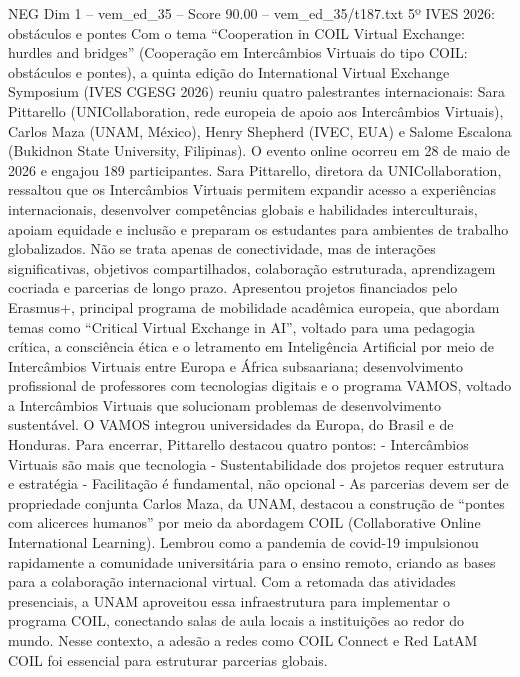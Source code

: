 \begin{textsample}{NEG Dim 1 – vem\_ed\_35 – Score 90.00 – vem\_ed\_35/t187.txt}  \label{ex:f1_neg_179}
5º IVES 2026: obstáculos e pontes Com o tema “Cooperation in COIL Virtual Exchange: hurdles and bridges” (Cooperação em Intercâmbios Virtuais do tipo COIL: obstáculos e pontes), a quinta edição do International Virtual Exchange Symposium (IVES CGESG 2026) reuniu quatro palestrantes internacionais: Sara Pittarello (UNICollaboration, rede europeia de apoio aos Intercâmbios Virtuais), Carlos Maza (UNAM, México), Henry Shepherd (IVEC, EUA) e Salome Escalona (Bukidnon State University, Filipinas).
O evento online ocorreu em 28 de maio de 2026 e engajou 189 participantes.
Sara Pittarello, diretora da UNICollaboration, ressaltou que os Intercâmbios Virtuais permitem expandir acesso a experiências internacionais, desenvolver competências globais e habilidades interculturais, apoiam equidade e inclusão e preparam os estudantes para ambientes de trabalho globalizados.
Não se trata apenas de conectividade, mas de interações significativas, objetivos compartilhados, colaboração estruturada, aprendizagem cocriada e parcerias de longo prazo.
Apresentou projetos financiados pelo Erasmus+, principal programa de mobilidade acadêmica europeia, que abordam temas como “Critical Virtual Exchange in AI”, voltado para uma pedagogia crítica, a consciência ética e o letramento em Inteligência Artificial por meio de Intercâmbios Virtuais entre Europa e África subsaariana; desenvolvimento profissional de professores com tecnologias digitais e o programa VAMOS, voltado a Intercâmbios Virtuais que solucionam problemas de desenvolvimento sustentável.
O VAMOS integrou universidades da Europa, do Brasil e de Honduras.
Para encerrar, Pittarello destacou quatro pontos: - Intercâmbios Virtuais são mais que tecnologia - Sustentabilidade dos projetos requer estrutura e estratégia - Facilitação é fundamental, não opcional - As parcerias devem ser de propriedade conjunta Carlos Maza, da UNAM, destacou a construção de “pontes com alicerces humanos” por meio da abordagem COIL (Collaborative Online International Learning).
Lembrou como a pandemia de covid-19 impulsionou rapidamente a comunidade universitária para o ensino remoto, criando as bases para a colaboração internacional virtual.
Com a retomada das atividades presenciais, a UNAM aproveitou essa infraestrutura para implementar o programa COIL, conectando salas de aula locais a instituições ao redor do mundo.
Nesse contexto, a adesão a redes como COIL Connect e Red LatAM COIL foi essencial para estruturar parcerias globais.

\end{textsample}

